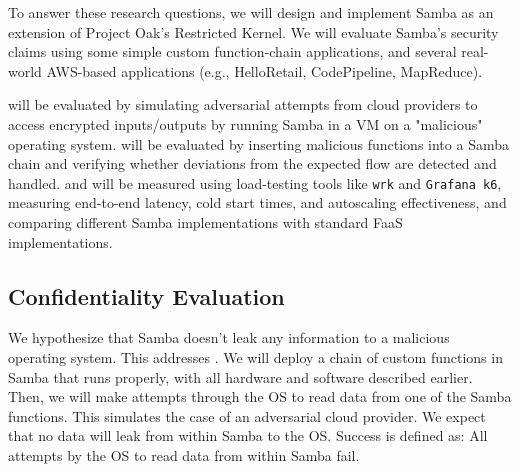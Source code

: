 


To answer these research questions, we will design and implement Samba as an extension of Project Oak's Restricted Kernel.
We will evaluate Samba's security claims using some simple custom function-chain applications, and several real-world AWS-based applications (e.g., HelloRetail, CodePipeline, MapReduce).

will be evaluated by simulating adversarial attempts from cloud providers to access encrypted inputs/outputs by running Samba in a VM on a "malicious" operating system.
will be evaluated by inserting malicious functions into a Samba chain and verifying whether deviations from the expected flow are detected and handled.
 and 
will be measured using load-testing tools like \texttt{wrk} and \texttt{Grafana k6}, measuring end-to-end latency, cold start times, and autoscaling effectiveness, and comparing different Samba implementations with standard FaaS implementations.

\subsection{Confidentiality Evaluation}
We hypothesize that Samba doesn't leak any information to a malicious operating system.
This addresses .
We will deploy a chain of custom functions in Samba that runs properly, with all hardware and software described earlier.
Then, we will make attempts through the OS to read data from one of the Samba functions.
This simulates the case of an adversarial cloud provider.
We expect that no data will leak from within Samba to the OS. Success is defined as: All attempts by the OS to read data from within Samba fail.

